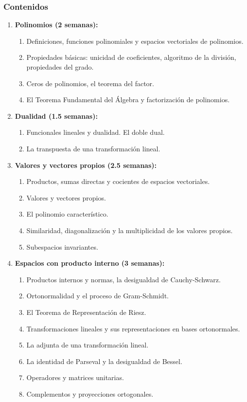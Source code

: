 \begin{refsection}
\subsubsection*{Contenidos}

\begin{enumerate}

\item \textbf{Polinomios (2 semanas):} 
\begin{enumerate}
    \item Definiciones, funciones polinomiales y espacios vectoriales de polinomios.
    \item Propiedades básicas: unicidad de coeficientes, algoritmo de la división, propiedades del grado.
    \item Ceros de polinomios, el teorema del factor.
    \item El Teorema Fundamental del Álgebra y factorización de polinomios.
\end{enumerate}

\item \textbf{Dualidad (1.5 semanas):} 
\begin{enumerate}
    \item Funcionales lineales y dualidad. El doble dual.
    \item La transpuesta de una transformación lineal.
\end{enumerate}

\item \textbf{Valores y vectores propios (2.5 semanas):} 
\begin{enumerate}
    \item Productos, sumas directas y cocientes de espacios vectoriales.
    \item Valores y vectores propios.
    \item El polinomio característico.
    \item Similaridad, diagonalización y la multiplicidad de los valores propios.
    \item Subespacios invariantes.
\end{enumerate}

\item \textbf{Espacios con producto interno (3 semanas):} 
\begin{enumerate}
    \item Productos internos y normas, la desigualdad de Cauchy-Schwarz.
    \item Ortonormalidad y el proceso de Gram-Schmidt.
    \item El Teorema de Representación de Riesz.
    \item Transformaciones lineales y sus representaciones en bases ortonormales.
    \item La adjunta de una transformación lineal.
    \item La identidad de Parseval y la desigualdad de Bessel.
    \item Operadores y matrices unitarias.
    \item Complementos y proyecciones ortogonales.
\end{enumerate}


\end{enumerate}
\end{refsection}

